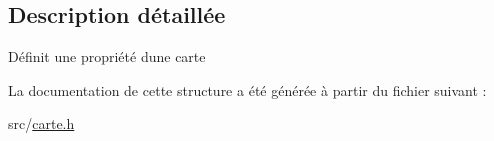 \subsection{Description détaillée}
Définit une propriété d\textquotesingle{}une carte 

La documentation de cette structure a été générée à partir du fichier suivant \+:\begin{DoxyCompactItemize}
\item 
src/\hyperlink{carte_8h}{carte.\+h}\end{DoxyCompactItemize}

